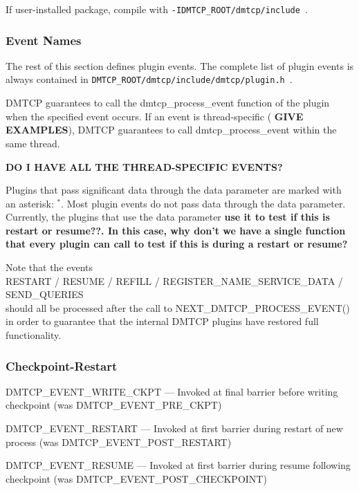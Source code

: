 \documentclass{article}
\begin{document}
If user-installed package, compile with {\tt -IDMTCP\_ROOT/dmtcp/include}~.

\subsubsection{Event Names}

The rest of this section defines plugin events.
The complete list of plugin events is always contained in
{\tt DMTCP\_ROOT/dmtcp/include/dmtcp/plugin.h}~.

DMTCP guarantees to call the dmtcp\_process\_event function of the plugin
when the specified event occurs.
If an event is thread-specific ({\bf
GIVE EXAMPLES}), DMTCP guarantees to call dmtcp\_process\_event within
the same thread.

{\bf DO I HAVE ALL THE THREAD-SPECIFIC EVENTS?}

Plugins that pass significant data through the data parameter
are marked with an asterisk: {}$^*$.
Most plugin events do not pass data through the data parameter.
Currently, the plugins
that use the data parameter {\bf use it to test if this is restart or resume??.
In this case, why don't we have a single function that every plugin can call
to test if this is during a restart or resume?}

Note that the events \\
   RESTART / RESUME / REFILL / REGISTER\_NAME\_SERVICE\_DATA / SEND\_QUERIES \\
should all be processed after the call to NEXT\_DMTCP\_PROCESS\_EVENT() in
order to guarantee that the internal DMTCP plugins have restored full
functionality.

\itemsep0pt
\subsubsection*{Checkpoint-Restart}
\begin{list}{}{\leftmargin=3em \itemindent=-2em}
\item
  DMTCP\_EVENT\_WRITE\_CKPT --- Invoked at final barrier before writing checkpoint
(was DMTCP\_EVENT\_PRE\_CKPT)
\item
  DMTCP\_EVENT\_RESTART --- Invoked at first barrier during restart of new process
(was DMTCP\_EVENT\_POST\_RESTART)
\item
  DMTCP\_EVENT\_RESUME --- Invoked at first barrier during resume following checkpoint
(was DMTCP\_EVENT\_POST\_CHECKPOINT)
\end{list}
\end{document}

